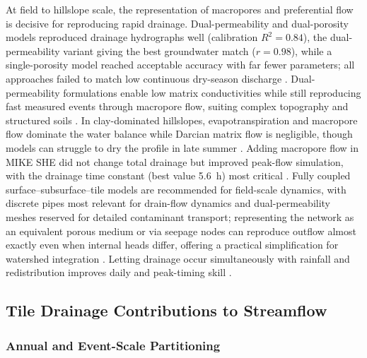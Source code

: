 At field to hillslope scale, the representation of macropores and preferential flow is decisive for reproducing rapid drainage. Dual-permeability and dual-porosity models reproduced drainage hydrographs well (calibration $R^2=0.84$), the dual-permeability variant giving the best groundwater match ($r=0.98$), while a single-porosity model reached acceptable accuracy with far fewer parameters; all approaches failed to match low continuous dry-season discharge \parencite{Varvaris2018}. Dual-permeability formulations enable low matrix conductivities while still reproducing fast measured events through macropore flow, suiting complex topography and structured soils \parencite{Warsta2014,Salo2017}. In clay-dominated hillslopes, evapotranspiration and macropore flow dominate the water balance while Darcian matrix flow is negligible, though models can struggle to dry the profile in late summer \parencite{Koivusalo1999}. Adding macropore flow in MIKE SHE did not change total drainage but improved peak-flow simulation, with the drainage time constant (best value 5.6~h) most critical \parencite{Zhou2013}. Fully coupled surface--subsurface--tile models are recommended for field-scale dynamics, with discrete pipes most relevant for drain-flow dynamics and dual-permeability meshes reserved for detailed contaminant transport; representing the network as an equivalent porous medium or via seepage nodes can reproduce outflow almost exactly even when internal heads differ, offering a practical simplification for watershed integration \parencite{DeSchepper2015,Carlier2007,Boico2022}. Letting drainage occur simultaneously with rainfall and redistribution improves daily and peak-timing skill \parencite{Xian2017}.

\subsection{Tile Drainage Contributions to Streamflow}

\subsubsection{Annual and Event-Scale Partitioning}


